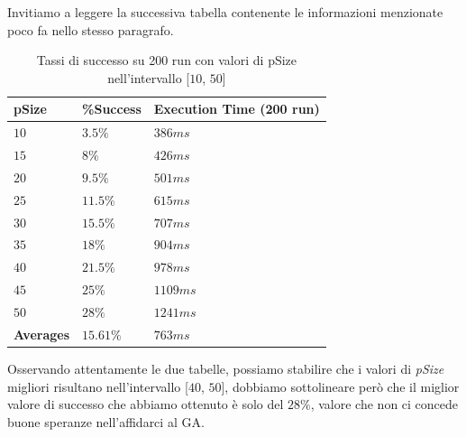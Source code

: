 Invitiamo a leggere la successiva tabella contenente le informazioni menzionate poco fa nello stesso paragrafo.
\begin{center}
    \begin{table}[H]
        \centering
        \begin{tabular}{|C{3cm}C{3cm}C{5.75cm}|}
            \hline
            \textbf{pSize} & \textbf{\%Success} & \textbf{Execution Time (200 run)} \\ \hline
            
             $10$ &  $3.5\%$ &  $386ms$ \\
            
            $15$ & $8\%$ & $426ms$ \\
            
             $20$ &  $9.5\%$ &  $501ms$ \\
            
            $25$ & $11.5\%$ & $615ms$\\
            
             $30$ &  $15.5\%$ &  $707ms$ \\
            
            $35$ & $18\%$ & $904ms$ \\
            
             $40$ &  $21.5\%$ &  $978ms$\\
            
            $45$ & $25\%$ & $1109ms$ \\
            
             $50$ &  $28\%$ &  $1241ms$ \\
            
            \hline
        
            \textbf{Averages} & $15.61\%$ & $763ms$ \\
            
            \hline
            
        \end{tabular}
        \caption{Tassi di successo su 200 run con valori di pSize nell'intervallo [$10$, $50$]}
        \label{tab:table2}
    \end{table}
\end{center}
Osservando attentamente le due tabelle, possiamo stabilire che i valori di \textit{pSize} migliori risultano nell'intervallo [$40$, $50$], dobbiamo sottolineare per\`o che il miglior valore di successo che abbiamo ottenuto \`e solo del $28\%$, valore che non ci concede buone speranze nell'affidarci al GA.
\vspace{3mm}

